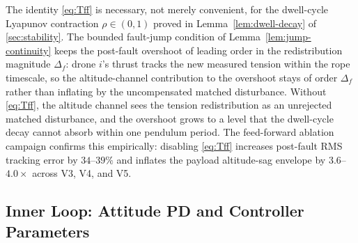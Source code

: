 \begin{remark}
\label{rem:passive-ft}
The identity \eqref{eq:Tff} is necessary, not merely convenient, for the dwell-cycle Lyapunov contraction $\rho \in (0, 1)$ proved in Lemma~\ref{lem:dwell-decay} of \cref{sec:stability}. The bounded fault-jump condition of Lemma~\ref{lem:jump-continuity} keeps the post-fault overshoot of leading order in the redistribution magnitude $\Delta_f$: drone $i$'s thrust tracks the new measured tension within the rope timescale, so the altitude-channel contribution to the overshoot stays of order $\Delta_f$ rather than inflating by the uncompensated matched disturbance. Without \eqref{eq:Tff}, the altitude channel sees the tension redistribution as an unrejected matched disturbance, and the overshoot grows to a level that the dwell-cycle decay cannot absorb within one pendulum period. The feed-forward ablation campaign confirms this empirically: disabling \eqref{eq:Tff} increases post-fault RMS tracking error by $34$--$39\%$ and inflates the payload altitude-sag envelope by $3.6$--$4.0\times$ across V3, V4, and V5.
\end{remark}

\subsection{Inner Loop: Attitude PD and Controller Parameters}
\label{sec:inner-loop}


